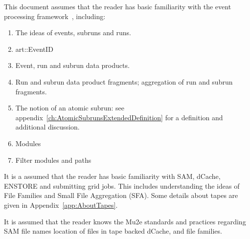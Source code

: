 This document assumes that the reader has basic familiarity with the \art event processing framework~\cite{ARTWORDPRESS}, including:

\begin{enumerate}
\item The ideas of events, subruns and runs.
\item {\code art::EventID}
\item Event, run and subrun  data products.
\item Run and subrun data product fragments; aggregation of run and subrun fragments.
\item The notion of an atomic subrun: see appendix~\ref{ch:AtomicSubrunsExtendedDefinition} for a definition and additional discussion.
\item Modules
\item Filter modules and paths
\end{enumerate}

It is a assumed that the reader has basic familiarity with SAM, dCache, ENSTORE and submitting grid jobs.
This includes understanding the ideas of File Families and Small File Aggregation (SFA).
Some details about tapes are given in Appendix~\ref{app:AboutTapes}.

It is assumed that the reader knows the Mu2e standards and practices regarding SAM file names\cite{Mu2eSAM}
location of files in tape backed dCache\cite{FileNames}, and file families.
